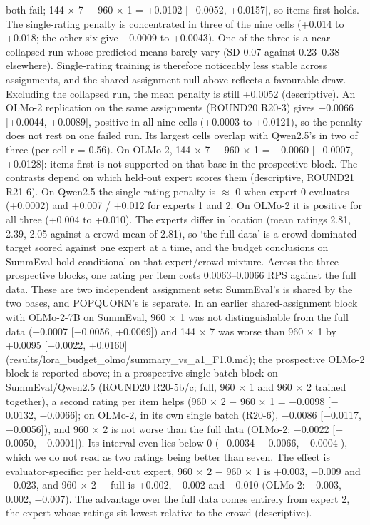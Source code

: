 \documentclass{article}
\begin{document}
both fail; 144 $\times$ 7 $-$ 960 $\times$ 1 = +0.0102 {[}+0.0052, +0.0157{]}, so items-first holds. The single-rating penalty is concentrated in three of the nine cells (+0.014 to +0.018; the other six give $-$0.0009 to +0.0043). One of the three is a near-collapsed run whose predicted means barely vary (SD 0.07 against 0.23--0.38 elsewhere). Single-rating training is therefore noticeably less stable across assignments, and the shared-assignment null above reflects a favourable draw. Excluding the collapsed run, the mean penalty is still +0.0052 (descriptive). An OLMo-2 replication on the same assignments (ROUND20 R20-3) gives +0.0066 {[}+0.0044, +0.0089{]}, positive in all nine cells (+0.0003 to +0.0121), so the penalty does not rest on one failed run. Its largest cells overlap with Qwen2.5's in two of three (per-cell r = 0.56). On OLMo-2, 144 $\times$ 7 $-$ 960 $\times$ 1 = +0.0060 {[}$-$0.0007, +0.0128{]}: items-first is not supported on that base in the prospective block. The contrasts depend on which held-out expert scores them (descriptive, ROUND21 R21-6). On Qwen2.5 the single-rating penalty is $\approx$ 0 when expert 0 evaluates (+0.0002) and +0.007 / +0.012 for experts 1 and 2. On OLMo-2 it is positive for all three (+0.004 to +0.010). The experts differ in location (mean ratings 2.81, 2.39, 2.05 against a crowd mean of 2.81), so `the full data' is a crowd-dominated target scored against one expert at a time, and the budget conclusions on SummEval hold conditional on that expert/crowd mixture. Across the three prospective blocks, one rating per item costs 0.0063--0.0066 RPS against the full data. These are two independent assignment sets: SummEval's is shared by the two bases, and POPQUORN's is separate. In an earlier shared-assignment block with OLMo-2-7B on SummEval, 960 $\times$ 1 was not distinguishable from the full data (+0.0007 {[}$-$0.0056, +0.0069{]}) and 144 $\times$ 7 was worse than 960 $\times$ 1 by +0.0095 {[}+0.0022, +0.0160{]} (results/lora\_budget\_olmo/summary\_vs\_a1\_F1.0.md); the prospective OLMo-2 block is reported above; in a prospective single-batch block on SummEval/Qwen2.5 (ROUND20 R20-5b/c; full, 960 $\times$ 1 and 960 $\times$ 2 trained together), a second rating per item helps (960 $\times$ 2 $-$ 960 $\times$ 1 = $-$0.0098 {[}$-$0.0132, $-$0.0066{]}; on OLMo-2, in its own single batch (R20-6), $-$0.0086 {[}$-$0.0117, $-$0.0056{]}), and 960 $\times$ 2 is not worse than the full data (OLMo-2: $-$0.0022 {[}$-$0.0050, $-$0.0001{]}). Its interval even lies below 0 ($-$0.0034 {[}$-$0.0066, $-$0.0004{]}), which we do not read as two ratings being better than seven. The effect is evaluator-specific: per held-out expert, 960 $\times$ 2 $-$ 960 $\times$ 1 is +0.003, $-$0.009 and $-$0.023, and 960 $\times$ 2 $-$ full is +0.002, $-$0.002 and $-$0.010 (OLMo-2: +0.003, $-$0.002, $-$0.007). The advantage over the full data comes entirely from expert 2, the expert whose ratings sit lowest relative to the crowd (descriptive).
\end{document}
